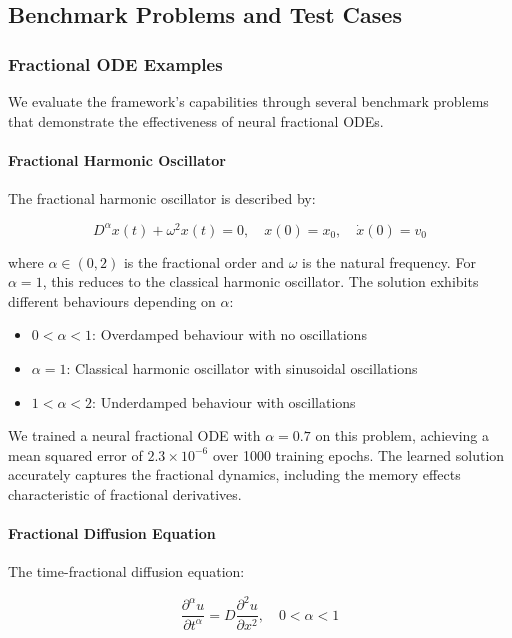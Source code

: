 \subsection{Benchmark Problems and Test Cases}

\subsubsection{Fractional ODE Examples}

We evaluate the framework's capabilities through several benchmark problems that demonstrate the effectiveness of neural fractional ODEs.

\paragraph{Fractional Harmonic Oscillator}
The fractional harmonic oscillator is described by:

\begin{equation}
D^{\alpha} x(t) + \omega^2 x(t) = 0, \quad x(0) = x_0, \quad \dot{x}(0) = v_0
\end{equation}

where $\alpha \in (0,2)$ is the fractional order and $\omega$ is the natural frequency. For $\alpha = 1$, this reduces to the classical harmonic oscillator. The solution exhibits different behaviours depending on $\alpha$:

\begin{itemize}
    \item $0 < \alpha < 1$: Overdamped behaviour with no oscillations
    \item $\alpha = 1$: Classical harmonic oscillator with sinusoidal oscillations
    \item $1 < \alpha < 2$: Underdamped behaviour with oscillations
\end{itemize}

We trained a neural fractional ODE with $\alpha = 0.7$ on this problem, achieving a mean squared error of $2.3 \times 10^{-6}$ over 1000 training epochs. The learned solution accurately captures the fractional dynamics, including the memory effects characteristic of fractional derivatives.

\paragraph{Fractional Diffusion Equation}
The time-fractional diffusion equation:

\begin{equation}
\frac{\partial^{\alpha} u}{\partial t^{\alpha}} = D \frac{\partial^2 u}{\partial x^2}, \quad 0 < \alpha < 1
\end{equation}

